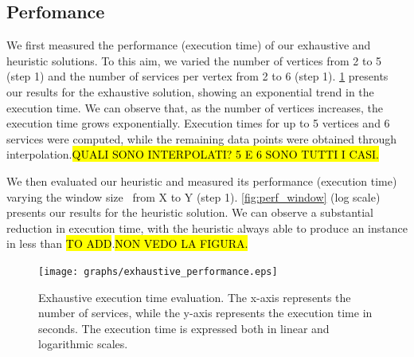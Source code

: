 \subsection{Perfomance}\label{subsec:experiments_performance}
We first measured the performance (execution time) of our exhaustive and heuristic solutions. To this aim, we varied the number of vertices from 2 to 5 (step 1) and the number of services per vertex from 2 to 6 (step 1). \cref{fig:perf_exhaustive} presents our results for the exhaustive solution, showing an exponential trend in the execution time. We can observe that, as the number of vertices increases, the execution time grows exponentially. Execution times for up to 5 vertices and 6 services were computed, while the remaining data points were obtained through interpolation.\hl{QUALI SONO INTERPOLATI? 5 E 6 SONO TUTTI I CASI.} 

We then evaluated our heuristic and measured its performance (execution time) varying the window size \windowsize\ from X to Y (step 1). \cref{fig:perf_window} (log scale) presents our results for the heuristic solution. We can observe a substantial reduction in execution time, with the heuristic always able to produce an instance in less than \hl{TO ADD}.\hl{NON VEDO LA FIGURA.}
\begin{figure}[htb!]
  \texttt{[image: graphs/exhaustive\_performance.eps]}
  \caption{Exhaustive execution time evaluation. The x-axis represents the number of services, while the y-axis represents the execution time in seconds. The execution time is expressed both in linear and logarithmic scales.}
  \label{fig:perf_exhaustive}
\end{figure}


